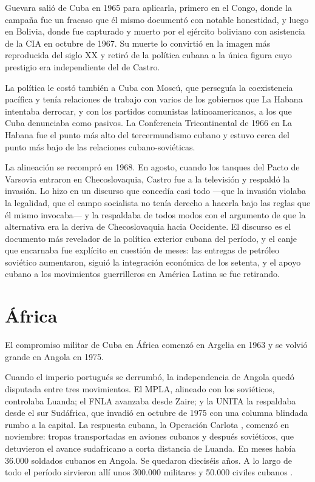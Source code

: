 Guevara salió de Cuba en 1965 para aplicarla, primero en el Congo, donde la
campaña fue un fracaso que él mismo documentó con notable honestidad, y luego en
Bolivia, donde fue capturado y muerto por el ejército boliviano con asistencia de
la CIA en octubre de 1967. Su muerte lo convirtió en la imagen más reproducida
del siglo XX y retiró de la política cubana a la única figura cuyo prestigio era
independiente del de Castro.

La política le costó también a Cuba con Moscú, que perseguía la coexistencia
pacífica y tenía relaciones de trabajo con varios de los gobiernos que La Habana
intentaba derrocar, y con los partidos comunistas latinoamericanos, a los que
Cuba denunciaba como pasivos. La Conferencia Tricontinental de 1966 en La Habana
fue el punto más alto del tercermundismo cubano y estuvo cerca del punto más bajo
de las relaciones cubano-soviéticas.

La alineación se recompró en 1968. En agosto, cuando los tanques del Pacto de
Varsovia entraron en Checoslovaquia, Castro fue a la televisión y respaldó la
invasión. Lo hizo en un discurso que concedía casi todo ---que la invasión
violaba la legalidad, que el campo socialista no tenía derecho a hacerla bajo las
reglas que él mismo invocaba--- y la respaldaba de todos modos con el argumento
de que la alternativa era la deriva de Checoslovaquia hacia Occidente. El
discurso es el documento más revelador de la política exterior cubana del
período, y el canje que encarnaba fue explícito en cuestión de meses: las entregas
de petróleo soviético aumentaron, siguió la integración económica de los setenta,
y el apoyo cubano a los movimientos guerrilleros en América Latina se fue
retirando.

\section{África}

El compromiso militar de Cuba en África comenzó en Argelia en 1963 y se volvió
grande en Angola en 1975.

Cuando el imperio portugués se derrumbó, la independencia de Angola quedó
disputada entre tres movimientos. El MPLA, alineado con los soviéticos, controlaba
Luanda; el FNLA avanzaba desde Zaire; y la UNITA la respaldaba desde el sur
Sudáfrica, que invadió en octubre de 1975 con una columna blindada rumbo a la
capital. La respuesta cubana, la Operación Carlota \citep{gleijeses2002}, comenzó
en noviembre: tropas transportadas en aviones cubanos y después soviéticos, que
detuvieron el avance sudafricano a corta distancia de Luanda. En meses había
36.000 soldados cubanos en Angola. Se quedaron dieciséis años. A lo largo de todo
el período sirvieron allí unos 300.000 militares y 50.000 civiles cubanos
\citep{gleijeses2013}.\unv{}

